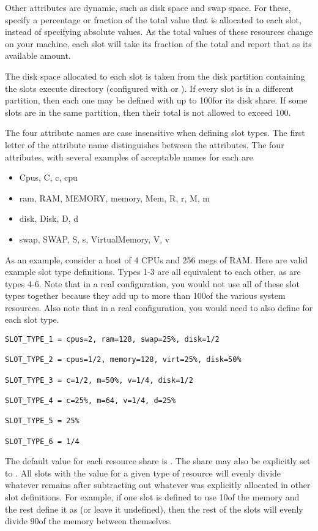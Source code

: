 Other attributes are dynamic, such as disk space and swap space.
For these, specify a percentage or fraction of the total
value that is allocated to each slot, instead of specifying absolute values.
As the total values of these resources change on your machine, each
slot will take its fraction of the total and report that as its
available amount.

The disk space allocated to each slot is taken from the disk partition
containing the slots execute directory (configured with
 or ).  If every slot is in a
different partition, then each one may be defined with up to
100\Percent for its disk share.  If some slots are in the same
partition, then their total is not allowed to exceed 100\Percent.

The four attribute names are case insensitive when defining slot types.
The first letter of the attribute name distinguishes between
the attributes.
The four attributes, with several examples of acceptable names for
each are
\begin{itemize}
  \item Cpus, C, c, cpu 
  \item ram, RAM, MEMORY, memory, Mem, R, r, M, m
  \item disk, Disk, D, d
  \item swap, SWAP, S, s, VirtualMemory, V, v
\end{itemize}

As an example, consider a
host of 4 CPUs and 256 megs of RAM.
Here are valid example slot type definitions. 
Types 1-3 are all equivalent to each other, as are types 4-6.  Note that
in a real configuration, you would not use all of these slot types together
because they add up to more than 100\Percent of the various system resources.
Also note that in a real configuration, you would need to also define
 for each slot type.

\begin{verbatim}
SLOT_TYPE_1 = cpus=2, ram=128, swap=25%, disk=1/2

SLOT_TYPE_2 = cpus=1/2, memory=128, virt=25%, disk=50%

SLOT_TYPE_3 = c=1/2, m=50%, v=1/4, disk=1/2

SLOT_TYPE_4 = c=25%, m=64, v=1/4, d=25%

SLOT_TYPE_5 = 25%

SLOT_TYPE_6 = 1/4
\end{verbatim}


The default value for each resource share is .  The share
may also be explicitly set to .  All slots with the value
 for a given type of resource will evenly divide
whatever remains after subtracting out whatever was explicitly
allocated in other slot definitions.  For example, if one slot is
defined to use 10\Percent of the memory and the rest define it as
 (or leave it undefined), then the rest of the slots will
evenly divide 90\Percent of the memory between themselves.

